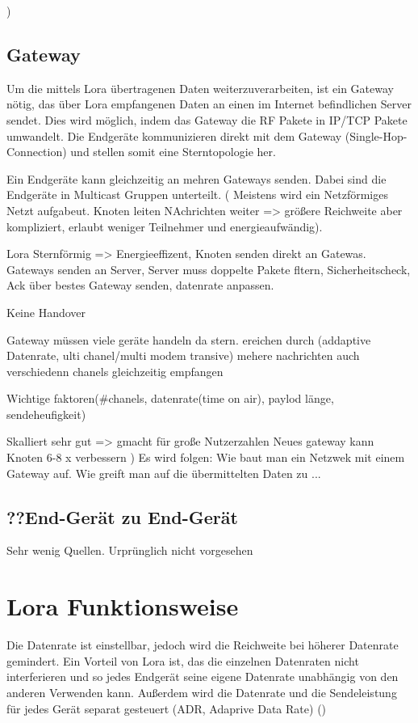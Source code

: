 \documentclass[a4paper,12pt]{article}
\begin{document}
    )
    \subsection{Gateway}
    Um die mittels Lora übertragenen Daten weiterzuverarbeiten, ist ein Gateway nötig, das über Lora empfangenen Daten an einen im Internet befindlichen Server sendet. Dies wird möglich, indem das Gateway die RF Pakete in IP/TCP Pakete umwandelt.
    Die Endgeräte kommunizieren direkt mit dem Gateway (Single-Hop-Connection) und stellen somit eine Sterntopologie her.

    Ein Endgeräte kann gleichzeitig an mehren Gateways senden. Dabei sind die Endgeräte in Multicast Gruppen unterteilt.
        \cite{TheThing}
        \cite{WhatIsLoRa}(
            Meistens wird ein Netzförmiges Netzt aufgabeut. Knoten leiten NAchrichten weiter => größere Reichweite aber kompliziert, erlaubt weniger Teilnehmer und energieaufwändig). 

            Lora Sternförmig => Energieeffizent, Knoten senden direkt an Gatewas. Gateways senden an Server, Server muss doppelte Pakete fltern, Sicherheitscheck, Ack über bestes Gateway senden, datenrate anpassen.

            Keine Handover

            Gateway müssen viele geräte handeln da stern. ereichen durch (addaptive Datenrate, ulti chanel/multi modem transive) mehere nachrichten auch verschiedenn chanels gleichzeitig empfangen

            Wichtige faktoren(#chanels, datenrate(time on air), paylod länge, sendeheufigkeit)
        
            Skalliert sehr gut => gmacht für große Nutzerzahlen
            Neues gateway kann Knoten 6-8 x verbessern
            )
        \cite{LoRaSpec}
        \cite{RFC8376}
    \newline{}\newline{} Es wird folgen: Wie baut man ein Netzwek mit einem Gateway auf. Wie greift man auf die übermittelten Daten zu ...
    \subsection{??End-Gerät zu End-Gerät}
    Sehr wenig Quellen. Urprünglich nicht vorgesehen
    \section{Lora Funktionsweise}
    Die Datenrate ist einstellbar, jedoch wird die Reichweite bei höherer Datenrate gemindert. Ein Vorteil von Lora ist, das die einzelnen Datenraten nicht interferieren und so jedes Endgerät seine eigene Datenrate unabhängig von den anderen Verwenden kann.
    Außerdem wird die Datenrate und die Sendeleistung für jedes Gerät separat gesteuert (ADR, Adaprive Data Rate)
        \cite{RFC8376}
        \cite{LoRaSpec}
        \cite{WhatIsLoRa}()
\end{document}
